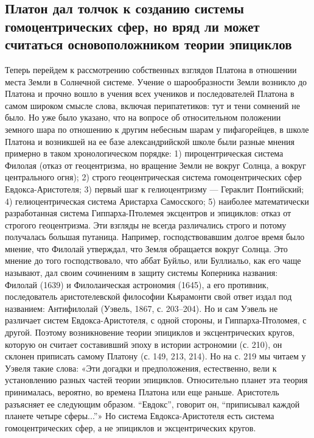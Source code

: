 \subsection{Платон  дал  толчок  к созданию  системы  гомоцентрических
сфер, но вряд ли может считаться основоположником теории эпициклов}

Теперь  перейдем   к  рассмотрению  собственных  взглядов   Платона  в
отношении  места Земли  в Солнечной  системе. Учение  о шарообразности
Земли  возникло до  Платона  и  прочно вошло  в  учения всех  учеников
и  последователей  Платона  в  самом  широком  смысле  слова,  включая
перипатетиков: тут и  тени сомнений не было. Но уже  было указано, что
на  вопросе об  относительном положении  земного шара  по отношению  к
другим небесным шарам  у пифагорейцев, в школе Платона  и возникшей на
ее  базе александрийской  школе были  разные мнения  примерно в  таком
хронологическом  порядке: 1)  пироцентрическая система  Филолая (отказ
от  геоцентризма,  но  вращение  Земли  не  вокруг  Солнца,  а  вокруг
центрального огня); 2) строго геоцентрическая система гомоцентрических
сфер Евдокса-Аристотеля;  3) первый шаг к  гелиоцентризму --- Гераклит
Понтийский;   4)  гелиоцентрическая   система  Аристарха   Самосского;
5)  наиболее  математически  разработанная  система  Гиппарха-Птолемея
эксцентров и эпициклов: отказ от строгого геоцентризма. Эти взгляды не
всегда  различались  строго  и  потому  получалась  большая  путаница.
Например,  господствовавшим  долгое  время было  мнение,  что  Филолай
утверждал,  что Земля  обращается вокруг  Солнца. Это  мнение до  того
господствовало,  что  аббат  Буйльо,   или  Буллиальо,  как  его  чаще
называют, дал  своим сочинениям  в защиту системы  Коперника названия:
Филолай  (1639) и  Филолаическая астрономия  (1645), а  его противник,
последователь  аристотелевской философии  Кьярамонти свой  ответ издал
под  названием: Антифилолай  (Уэвель,  1867, с.  203--204).  Но и  сам
Уэвель  не различает  систем  Евдокса-Аристотеля, с  одной стороны,  и
Гиппарха-Птоломея, с другой. Поэтому  возникновение теории эпициклов и
эксцентрических кругов, которую он считает составивший эпоху в истории
астрономии  (с. 210),  он склонен  приписать самому  Платону (с.  149,
213,  214).  Но  на с.  219  мы  читаем  у  Уэвеля такие  слова:  «Эти
догадки  и  предположения,  естественно, вели  к  установлению  разных
частей теории  эпициклов. Относительно планет эта  теория принималась,
вероятно,  во времена  Платона или  еще раньше.  Аристотель разъясняет
ее  следующим образом.  ``Евдокс'',  говорит  он, ``приписывал  каждой
планете четыре сферы...''» Но  система Евдокса-Аристотеля есть система
гомоцентрических сфер, а не эпициклов и эксцентрических кругов.

